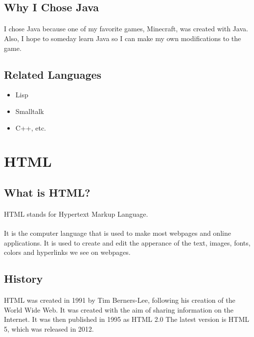 \documentclass{article}
\begin{document}
	\subsection{Why I Chose Java}
	\paragraph{}I chose Java because one of my favorite games, Minecraft, was created with Java.
	Also, I hope to someday learn Java so I can make my own modifications to the game.
	\subsection{Related Languages}
	\begin{itemize}
		\item Lisp
		\item Smalltalk
		\item C++, etc.
	\end{itemize}

\section{HTML}
\subsection{What is HTML?}
\paragraph{}HTML stands for Hypertext Markup Language.
\paragraph{}It is the computer language that is used to make most webpages and online applications.
It is used to create and edit the apperance of the text, images, fonts, colors and hyperlinks we see on webpages.
\subsection{History}
\paragraph{}HTML was created in 1991 by Tim Berners-Lee, following his creation of the World Wide Web.
It was created with the aim of sharing information on the Internet.
It was then published in 1995 as HTML 2.0
The latest version is HTML 5, which was released in 2012.
\end{document}
